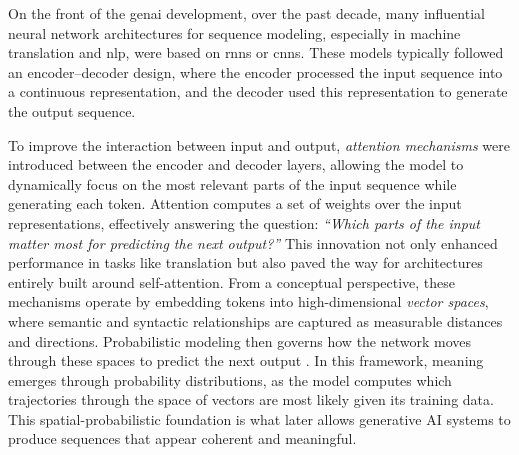 On the front of the \gls{genai} development, over the past decade, many influential neural network architectures for sequence
modeling, especially in machine translation and \gls{nlp}, were based on
\glspl{rnn} or \glspl{cnn}. These models typically followed an
encoder–decoder design, where the encoder processed the input sequence into a
continuous representation, and the decoder used this representation to
generate the output sequence.

To improve the interaction between input and output, \emph{attention mechanisms}
were introduced between the encoder and decoder layers, allowing the model to
dynamically focus on the most relevant parts of the input sequence while
generating each token. Attention computes a set of weights over the input
representations, effectively answering the question:
\emph{“Which parts of the input matter most for predicting the next output?”}
This innovation not only enhanced performance in tasks like translation but
also paved the way for architectures entirely built around self-attention. From a conceptual perspective, these mechanisms operate by embedding tokens
into high-dimensional \emph{vector spaces}, where semantic and syntactic
relationships are captured as measurable distances and directions.
Probabilistic modeling then governs how the network moves through these spaces
to predict the next output \parencite[198]{montanari2025}. In this framework,
meaning emerges through probability distributions, as the
model computes which trajectories through the space of vectors are most
likely given its training data. This spatial-probabilistic foundation is what
later allows generative AI systems to produce sequences that appear coherent
and meaningful.


